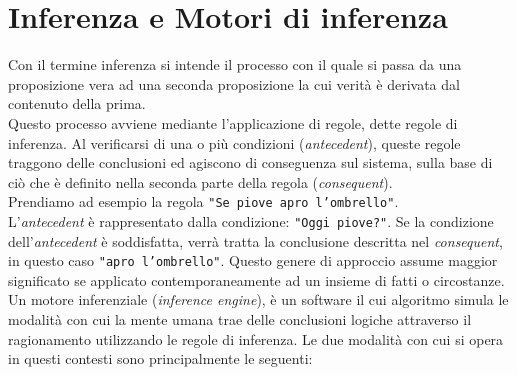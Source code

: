 \section{Inferenza e Motori di inferenza}

 \label{App:AppendiceInference}
 Con  il termine inferenza si intende il processo con il quale si passa da una proposizione vera ad una seconda proposizione la cui verità è derivata dal contenuto della prima. \\
 Questo processo avviene mediante l'applicazione di regole, dette regole di inferenza. Al verificarsi di una o più condizioni (\textit{antecedent}), queste regole traggono delle conclusioni ed agiscono di conseguenza sul sistema, sulla base di ciò che è definito nella seconda parte della regola (\textit{consequent}).\\
 Prendiamo ad esempio la regola \texttt{"Se piove apro l'ombrello"}. \\ L'\textit{antecedent} è rappresentato dalla condizione: \texttt{"Oggi piove?"}. Se la condizione dell'\textit{antecedent} è soddisfatta, verrà tratta la conclusione descritta nel \textit{consequent}, in questo caso \texttt{"apro l'ombrello"}. 
 Questo genere di approccio assume maggior significato se applicato contemporaneamente ad un insieme di fatti o circostanze. \\
 Un motore inferenziale (\textit{inference engine}), è un software il cui algoritmo simula le modalità con cui la mente umana trae delle conclusioni logiche attraverso il ragionamento utilizzando le regole di inferenza.
 Le due modalità con cui si opera in questi contesti sono principalmente le seguenti:

